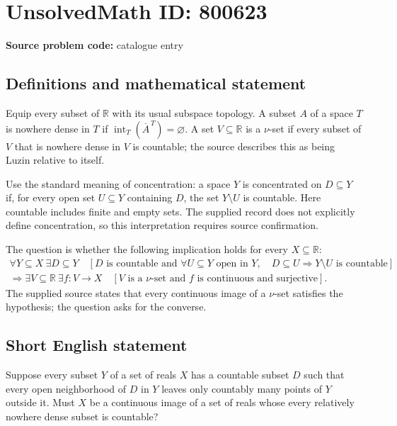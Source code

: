 \documentclass[11pt]{article}
\newcommand{\R}{\mathbb{R}}
\begin{document}
\section*{UnsolvedMath ID: 800623}
\textbf{Source problem code:} catalogue entry
\subsection{Definitions and mathematical statement}
Equip every subset of \(\R\) with its usual subspace topology. A subset \(A\) of a space \(T\) is nowhere dense in \(T\) if \(\operatorname{int}_T(\overline{A}^{\,T})=\varnothing\). A set \(V\subseteq\R\) is a \(\nu\)-set if every subset of \(V\) that is nowhere dense in \(V\) is countable; the source describes this as being Luzin relative to itself.

Use the standard meaning of concentration: a space \(Y\) is concentrated on \(D\subseteq Y\) if, for every open set \(U\subseteq Y\) containing \(D\), the set \(Y\setminus U\) is countable. Here countable includes finite and empty sets. The supplied record does not explicitly define concentration, so this interpretation requires source confirmation.

The question is whether the following implication holds for every \(X\subseteq\R\):
\[
\begin{gathered}
\forall Y\subseteq X\ \exists D\subseteq Y\quad
\left[ D\text{ is countable and }
\forall U\subseteq Y\text{ open in }Y,
\quad D\subseteq U\Longrightarrow Y\setminus U\text{ is countable}\right]
\\[2pt]
\Longrightarrow
\exists V\subseteq\R\ \exists f:V\to X\quad
\left[V\text{ is a }\nu\text{-set and }f\text{ is continuous and surjective}\right].
\end{gathered}
\]
The supplied source states that every continuous image of a \(\nu\)-set satisfies the hypothesis; the question asks for the converse.
\subsection{Short English statement}
Suppose every subset \(Y\) of a set of reals \(X\) has a countable subset \(D\) such that every open neighborhood of \(D\) in \(Y\) leaves only countably many points of \(Y\) outside it. Must \(X\) be a continuous image of a set of reals whose every relatively nowhere dense subset is countable?
\end{document}
